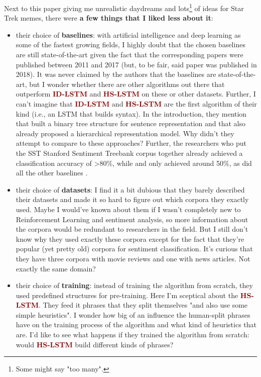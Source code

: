\documentclass{article}
\begin{document}
Next to this paper giving me unrealistic daydreams and lots\footnote{Some might say "too many".} of ideas for Star Trek memes, there were \textbf{a few things that I liked less about it}:\begin{itemize}
    \item their choice of \textbf{baselines}: with artificial intelligence and deep learning as some of the fastest growing fields, I highly doubt that the chosen baselines are still state-of-the-art given the fact that the corresponding papers were published between 2011 and 2017 (but, to be fair, said paper was published in 2018). It was never claimed by the authors that the baselines are state-of-the-art, but I wonder whether there are other algorithms out there that outperform \textcolor{Maroon}{\textbf{ID-LSTM}} and \textcolor{Maroon}{\textbf{HS-LSTM}} on these or other datasets. Further, I can't imagine that \textcolor{Maroon}{\textbf{ID-LSTM}} and \textcolor{Maroon}{\textbf{HS-LSTM}} are the first algorithm of their kind (i.e., an LSTM that builds syntax). In the introduction, they mention that \cite{yogatama2016} built a binary tree structure for sentence representation and that \cite{chung2017} also already proposed a hierarchical representation model. Why didn't they attempt to compare to these approaches? Further, the researchers who put the SST Stanford Sentiment Treebank corpus together already achieved a classification accuracy of >80\%, while and \cite{zhang2018} only achieved around 50\%, as did all the other baselines \citep{socher-etal-2011}.
    \item their choice of \textbf{datasets}: I find it a bit dubious that they barely described their datasets and made it so hard to figure out which corpora they exactly used. Maybe I would've known about them if I wasn't completely new to Reinforcement Learning and sentiment analysis, so more information about the corpora would be redundant to researchers in the field. But I still don't know why they used exactly these corpora except for the fact that they're popular (yet pretty old) corpora for sentiment classification. It's curious that they have three corpora with movie reviews and one with news articles. Not exactly the same domain?
    \item their choice of \textbf{training}: instead of training the algorithm from scratch, they used predefined structures for pre-training. Here I'm sceptical about the \textcolor{Maroon}{\textbf{HS-LSTM}}. They feed it phrases that they split themselves "and also use some simple heuristics". I wonder how big of an influence the human-split phrases have on the training process of the algorithm and what kind of heuristics that are. I'd like to see what happens if they trained the algorithm from scratch: would \textcolor{Maroon}{\textbf{HS-LSTM}} build different kinds of phrases?
\end{itemize}
\end{document}
